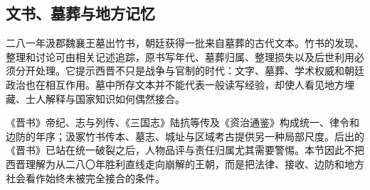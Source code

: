 \subsection{文书、墓葬与地方记忆}

二八一年汲郡魏襄王墓出竹书，朝廷获得一批来自墓葬的古代文本。竹书的发现、整理和讨论可由相关记述追踪，原书写年代、墓葬归属、整理损失以及后世利用必须分开处理。它提示西晋不只是战争与官制的时代：文字、墓葬、学术权威和朝廷政治也在相互作用。墓中所存文本并不能代表一般读写经验，却使人看见地方埋藏、士人解释与国家知识如何偶然接合。

《晋书》帝纪、志与列传、《三国志》陆抗等传及《资治通鉴》构成统一、律令和边防的年序；汲冢竹书传本、墓志、城址与区域考古提供另一种局部尺度。后出的《晋书》已站在统一破裂之后，人物品评与责任归属尤其需要警惕。本节因此不把西晋理解为从二八〇年胜利直线走向崩解的王朝，而是把法律、接收、边防和地方社会看作始终未被完全接合的条件。
